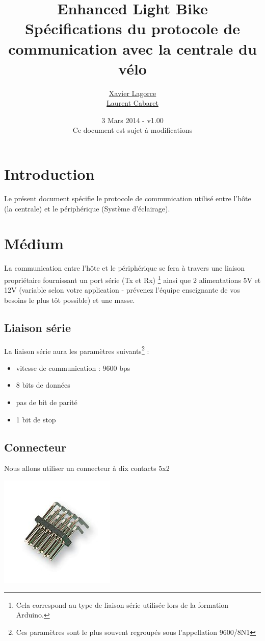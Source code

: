 \documentclass[a4paper, 10pt]{article} %
\title{{\huge Enhanced Light Bike}\vspace{0.5cm}\\Spécifications du protocole de communication avec la centrale du vélo}
\author{\href{mailto:Xavier.Lagorce@crans.org}{Xavier Lagorce}\\\href{mailto:laurent.cabaret@ecp.fr}{Laurent Cabaret}}
\date{3 Mars 2014 - v1.00\\Ce document est sujet à modifications}
\newcommand{\saut}{\vspace{0.5cm}}
\begin{document}
\maketitle

\vspace{1cm}

\tableofcontents
\newpage

\section{Introduction}

Le présent document spécifie le protocole de communication utilisé entre l'hôte (la centrale)
et le périphérique (Système d'éclairage).

\section{Médium}

La communication entre l'hôte et le périphérique se fera à travers une liaison propriétaire fournissant un port série (Tx et Rx) \footnote{Cela correspond au type de liaison série utilisée lors de la formation Arduino.} ainsi que 2 alimentations 5V et 12V (variable selon votre application - prévenez l'équipe enseignante de vos besoins le plus tôt possible) et une masse.

\saut

\subsection{Liaison série}
La liaison série aura les paramètres suivants\footnote{Ces paramètres sont le plus souvent regroupés
sous l'appellation 9600/8N1} :
\begin{itemize}
  \item vitesse de communication : 9600 bps
  \item 8 bits de données
  \item pas de bit de parité
  \item 1 bit de stop
\end{itemize}

\subsection{Connecteur}

Nous allons utiliser un connecteur à dix contacts 5x2

\begin{center}
\includegraphics[scale=0.5]{HE10.jpg}
\end{center}
\end{document}
